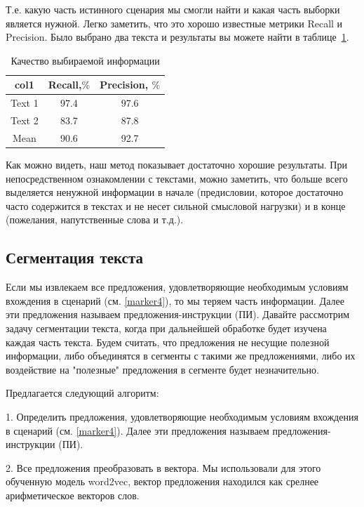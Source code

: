 \documentclass[12pt]{article}
\begin{document}
Т.е. какую часть истинного сценария мы смогли найти и какая часть выборки является нужной. Легко заметить, что это хорошо известные метрики Recall и Precision. Было выбрано два текста и результаты вы можете найти в таблице~\ref{table:1}.

\begin{table}[h!]
\centering
\begin{tabular}{||c |c |c||} 
 \hline
  col1& Recall,$\%$ & Precision, $\%$\\
 \hline
 Text 1 &  97.4&  97.6\\ 
 Text 2 &  83.7&  87.8\\
 \hline
 Mean & 90.6& 92.7\\
 \hline
\end{tabular}
\caption{Качество выбираемой информации}
\label{table:1}
\end{table}

Как можно видеть, наш метод показывает достаточно хорошие результаты. При непосредственном ознакомлении с текстами, можно заметить, что больше всего выделяется ненужной информации в начале (предисловии, которое достаточно часто содержится в текстах и не несет сильной смысловой нагрузки) и в конце (пожелания, напутственные слова и т.д.).

\subsection{Сегментация текста}
\label{segmentation}

Если мы извлекаем все предложения, удовлетворяющие необходимым условиям вхождения в сценарий (см. \ref{marker4}), то мы теряем часть информации. Далее эти предложения называем предложения-инструкции (ПИ). Давайте рассмотрим задачу сегментации текста, когда при дальнейшей обработке будет изучена каждая часть текста. Будем считать, что предложения не несущие полезной информации, либо объединятся в сегменты с такими же предложениями, либо их воздействие на "полезные" предложения в сегменте будет незначительно.

Предлагается следующий алгоритм:


	1. Определить предложения, удовлетворяющие необходимым условиям вхождения в сценарий (см. \ref{marker4}). Далее эти предложения называем предложения-инструкции (ПИ). 

	2. Все предложения преобразовать в вектора. Мы использовали для этого обученную модель word2vec, вектор предложения находился как срелнее арифметическое векторов слов.
\end{document}
